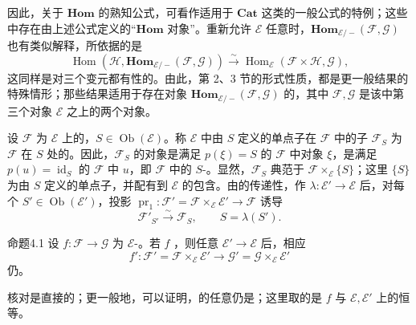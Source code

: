 因此，关于 $\mathbf{Hom}$ 的熟知公式，可看作适用于 $\mathbf{Cat}$ 这类的一般公式的特例；这些中存在由上述公式定义的“$\mathbf{Hom}$ 对象”。重新允许 $\mathcal E$ 任意时，$\mathbf{Hom}_{\mathcal E/-}(\mathcal F,\mathcal G)$ 也有类似解释，所依据的是
\[
 \operatorname{Hom}(\mathcal H,\mathbf{Hom}_{\mathcal E/-}(\mathcal F,\mathcal G))
 \xrightarrow{\sim}\operatorname{Hom}_{\mathcal E}(\mathcal F\times\mathcal H,\mathcal G),
\]
这同样是对三个变元都有性的。由此，第 2、3 节的形式性质，都是更一般结果的特殊情形；那些结果适用于存在对象 $\mathbf{Hom}_{\mathcal E/-}(\mathcal F,\mathcal G)$ 的，其中 $\mathcal F,\mathcal G$ 是该中第三个对象 $\mathcal E$ 之上的两个对象。

设 $\mathcal F$ 为 $\mathcal E$ 上的，$S\in\operatorname{Ob}(\mathcal E)$。称 $\mathcal E$ 中由 $S$ 定义的单点子在 $\mathcal F$ 中的子 $\mathcal F_S$ 为 $\mathcal F$ 在 $S$ 处的。因此，$\mathcal F_S$ 的对象是满足 $p(\xi)=S$ 的 $\mathcal F$ 中对象 $\xi$，是满足 $p(u)=\operatorname{id}_S$ 的 $\mathcal F$ 中 $u$，即 $\mathcal F$ 中的 $S$-。显然，$\mathcal F_S$ 典范于 $\mathcal F\times_{\mathcal E}\{S\}$；这里 $\{S\}$ 为由 $S$ 定义的单点子，并配有到 $\mathcal E$ 的包含。由的传递性，作 $\lambda:\mathcal E'\to\mathcal E$ 后，对每个 $S'\in\operatorname{Ob}(\mathcal E')$，投影 $\operatorname{pr}_1:\mathcal F'=\mathcal F\times_{\mathcal E}\mathcal E'\to\mathcal F$ 诱导
\[
 \mathcal F'_{S'}\xrightarrow{\sim}\mathcal F_S,\qquad S=\lambda(S').
\]

\begin{SGAresult}{命题}{4.1}
设 $f:\mathcal F\to\mathcal G$ 为 $\mathcal E$-。若 $f$ ，则任意 $\mathcal E'\to\mathcal E$ 后，相应
\[
 f':\mathcal F'=\mathcal F\times_{\mathcal E}\mathcal E'\longrightarrow
 \mathcal G'=\mathcal G\times_{\mathcal E}\mathcal E'
\]
仍。
\end{SGAresult}
核对是直接的；更一般地，可以证明，的任意仍是；这里取的是 $f$ 与 $\mathcal E,\mathcal E'$ 上的恒等。

